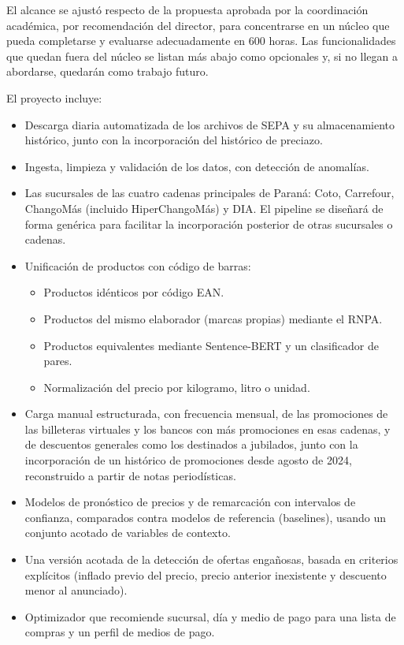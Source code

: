 \documentclass[
11pt, %
]{charter}
\begin{document}
El alcance se ajustó respecto de la propuesta aprobada por la coordinación académica, por recomendación del director, para concentrarse en un núcleo que pueda completarse y evaluarse adecuadamente en 600 horas. Las funcionalidades que quedan fuera del núcleo se listan más abajo como opcionales y, si no llegan a abordarse, quedarán como trabajo futuro.

El proyecto incluye:

\begin{itemize}
	\item Descarga diaria automatizada de los archivos de SEPA y su almacenamiento histórico, junto con la incorporación del histórico de preciazo.
	\item Ingesta, limpieza y validación de los datos, con detección de anomalías.
	\item Las sucursales de las cuatro cadenas principales de Paraná: Coto, Carrefour, ChangoMás (incluido HiperChangoMás) y DIA. El pipeline se diseñará de forma genérica para facilitar la incorporación posterior de otras sucursales o cadenas.
	\item Unificación de productos con código de barras:
		\begin{itemize}
		\item Productos idénticos por código EAN.
		\item Productos del mismo elaborador (marcas propias) mediante el RNPA.
		\item Productos equivalentes mediante Sentence-BERT y un clasificador de pares.
		\item Normalización del precio por kilogramo, litro o unidad.
		\end{itemize}
	\item Carga manual estructurada, con frecuencia mensual, de las promociones de las billeteras virtuales y los bancos con más promociones en esas cadenas, y de descuentos generales como los destinados a jubilados, junto con la incorporación de un histórico de promociones desde agosto de 2024, reconstruido a partir de notas periodísticas.
	\item Modelos de pronóstico de precios y de remarcación con intervalos de confianza, comparados contra modelos de referencia (baselines), usando un conjunto acotado de variables de contexto.
	\item Una versión acotada de la detección de ofertas engañosas, basada en criterios explícitos (inflado previo del precio, precio anterior inexistente y descuento menor al anunciado).
	\item Optimizador que recomiende sucursal, día y medio de pago para una lista de compras y un perfil de medios de pago.

\end{itemize}
\end{document}
